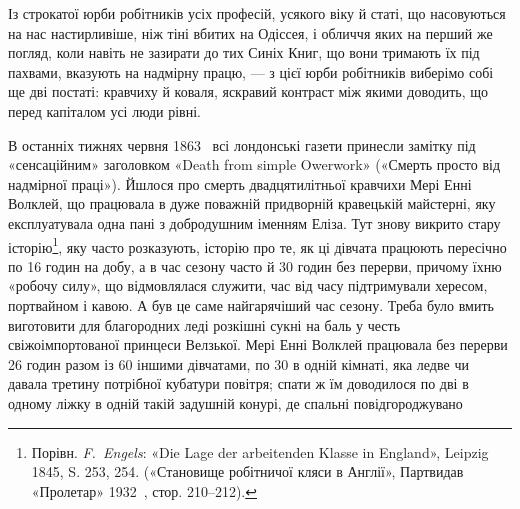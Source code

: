 Із строкатої юрби робітників усіх професій, усякого віку й
статі, що насовуються на нас настирливіше, ніж тіні вбитих на
Одіссея, і обличчя яких на перший же погляд, коли навіть не
зазирати до тих Синіх Книг, що вони тримають їх під пахвами,
вказують на надмірну працю, — з цієї юрби робітників виберімо
собі ще дві постаті: кравчиху й коваля, яскравий контраст між
якими доводить, що перед капіталом усі люди рівні.

В останніх тижнях червня 1863~ всі лондонські газети принесли
замітку під «сенсаційним» заголовком «Death from simple
Owerwork» («Смерть просто від надмірної праці»). Йшлося про
смерть двадцятилітньої кравчихи Мері Енні Волклей, що працювала
в дуже поважній придворній кравецькій майстерні, яку експлуатувала
одна пані з добродушним іменням Еліза. Тут знову
викрито стару історію\footnote{
Порівн. \emph{F.~Engels}: «Die Lage der arbeitenden Klasse in England»,
Leipzig 1845, S. 253, 254. («Становище робітничої кляси в Англії»,
Партвидав «Пролетар» 1932~, стор. 210--212).
}, яку часто розказують, історію про те,
як ці дівчата працюють пересічно по 16 годин на добу, а в час
сезону часто й 30 годин без перерви, причому їхню «робочу силу»,
що відмовлялася служити, час від часу підтримували хересом,
портвайном і кавою. А був це саме найгарячіший час сезону. Треба
було вмить виготовити для благородних леді розкішні сукні на
баль у честь свіжоімпортованої принцеси Велзької. Мері Енні
Волклей працювала без перерви 26 годин разом із 60 іншими
дівчатами, по 30 в одній кімнаті, яка ледве чи давала третину
потрібної кубатури повітря; спати ж їм доводилося по дві в одному
ліжку в одній такій задушній конурі, де спальні повідгороджувано
